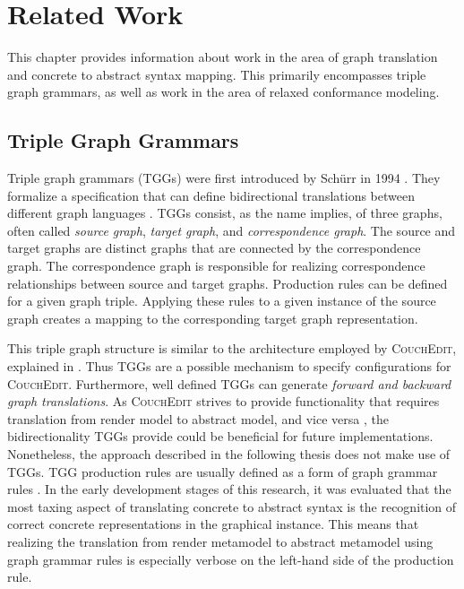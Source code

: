 \chapter{Related Work}
\label{ch:related_work}
This chapter provides information about work in the area of graph translation and concrete to abstract syntax mapping. This primarily encompasses triple graph grammars, as well as work in the area of relaxed conformance modeling.




\section{Triple Graph Grammars}
\label{sec:tggs}
Triple graph grammars (TGGs) were first introduced by Schürr in 1994 \cite{schurr_specification_1994}. They formalize a specification that can define bidirectional translations between different graph languages \cite{schurr_15_2008}. TGGs consist, as the name implies, of three graphs, often called \emph{source graph}, \emph{target graph}, and \emph{correspondence graph}. The source and target graphs are distinct graphs that are connected by the correspondence graph. The correspondence graph is responsible for realizing correspondence relationships between source and target graphs. Production rules can be defined for a given graph triple. Applying these rules to a given instance of the source graph creates a mapping to the corresponding target graph representation.

This triple graph structure is similar to the architecture employed by \textsc{CouchEdit}, explained in . Thus TGGs are a possible mechanism to specify configurations for \textsc{CouchEdit}. Furthermore, well defined TGGs can generate \emph{forward and backward graph translations}. As \textsc{CouchEdit} strives to provide functionality that requires translation from render model to abstract model, and vice versa \cite{nachreiner_couchedit_2020}, the bidirectionality TGGs provide could be beneficial for future implementations. Nonetheless, the approach described in the following thesis does not make use of TGGs. TGG production rules are usually defined as a form of graph grammar rules \cite{schurr_15_2008}. In the early development stages of this research, it was evaluated that the most taxing aspect of translating concrete to abstract syntax is the recognition of correct concrete representations in the graphical instance. This means that realizing the translation from render metamodel to abstract metamodel using graph grammar rules is especially verbose on the left-hand side of the production rule.

